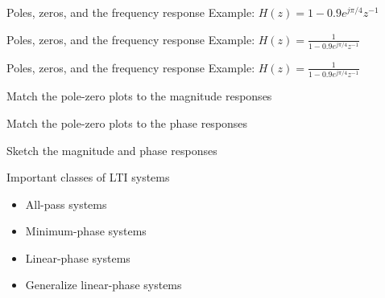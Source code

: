 \documentclass[10pt, handout]{beamer}
\begin{document}
\begin{frame}{Poles, zeros, and the frequency response}
	Example: $H(z) = 1 - 0.9e^{j\pi/4}z^{-1}$
	\begin{center}
		\resizebox{\linewidth}{!}{}
	\end{center}	
\end{frame}

\begin{frame}{Poles, zeros, and the frequency response}
	Example: $H(z) = \displaystyle\frac{1}{1 - 0.9e^{j\pi/4}z^{-1}}$
	\begin{center}
		\resizebox{\linewidth}{!}{}
	\end{center}	
\end{frame}

\begin{frame}{Poles, zeros, and the frequency response}
	Example: $H(z) = \displaystyle\frac{1}{1 - 0.9e^{j\pi/4}z^{-1}}$
	\begin{center}
		\resizebox{\linewidth}{!}{}
	\end{center}	
\end{frame}

%
\begin{frame}{Match the pole-zero plots to the magnitude responses}
	\hspace*{-1cm}\resizebox{\paperwidth}{!}{}
\end{frame}

%
\begin{frame}{Match the pole-zero plots to the phase responses}
	\hspace*{-1cm}\resizebox{\paperwidth}{!}{}
\end{frame}

%
\begin{frame}{Sketch the magnitude and phase responses}
	\hspace*{-1cm}\resizebox{0.95\paperwidth}{!}{}
\end{frame}

\begin{frame}{Important classes of LTI systems}

\begin{itemize}
	\item All-pass systems
	\item Minimum-phase systems
	\item Linear-phase systems
	\item Generalize linear-phase systems
\end{itemize}

\end{frame}
\end{document}

